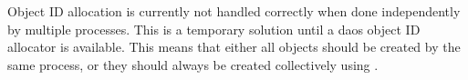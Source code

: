 \documentclass[../design_doc.tex]{subfiles}
\begin{document}
Object ID allocation is currently not handled correctly when done independently by multiple processes. This is a temporary solution until a \acrshort{daos} object ID allocator is available. This means that either all objects should be created by the same process, or they should always be created collectively using .
\end{document}
